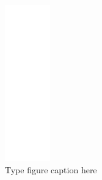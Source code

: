 \documentclass{article}
\begin{document}
\begin{figure}[h!]
 \begin{center}
  \includegraphics[max width=\textwidth]{calculations/872.png}
  \caption{Type figure caption here}
  \label{fig:872}
 \end{center}
\end{figure}
\end{document}
